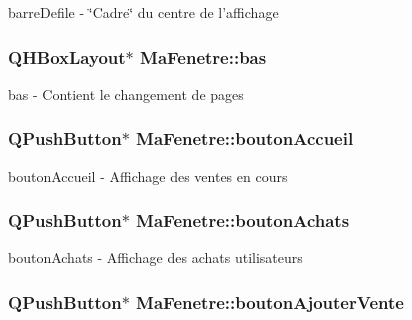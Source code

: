 barre\-Defile -\/ \char`\"{}\-Cadre\char`\"{} du centre de l'affichage 

\hypertarget{class_ma_fenetre_aff3315e53711db117feadab319660cee}{
\subsubsection[{bas}]{\setlength{\rightskip}{0pt plus 5cm}Q\-H\-Box\-Layout$\ast$ Ma\-Fenetre\-::bas\hspace{0.3cm}{\ttfamily [protected]}}}\label{class_ma_fenetre_aff3315e53711db117feadab319660cee}


bas -\/ Contient le changement de pages 

\hypertarget{class_ma_fenetre_a0316aa06b89b812a8528a8ccbe81561a}{
\subsubsection[{bouton\-Accueil}]{\setlength{\rightskip}{0pt plus 5cm}Q\-Push\-Button$\ast$ Ma\-Fenetre\-::bouton\-Accueil\hspace{0.3cm}{\ttfamily [protected]}}}\label{class_ma_fenetre_a0316aa06b89b812a8528a8ccbe81561a}


bouton\-Accueil -\/ Affichage des ventes en cours 

\hypertarget{class_ma_fenetre_aba39f3cf91351a7d6d0a6188ac831ad5}{
\subsubsection[{bouton\-Achats}]{\setlength{\rightskip}{0pt plus 5cm}Q\-Push\-Button$\ast$ Ma\-Fenetre\-::bouton\-Achats\hspace{0.3cm}{\ttfamily [protected]}}}\label{class_ma_fenetre_aba39f3cf91351a7d6d0a6188ac831ad5}


bouton\-Achats -\/ Affichage des achats utilisateurs 

\hypertarget{class_ma_fenetre_a422d1e619aa51ff42b5ecd2c5476ce19}{
\subsubsection[{bouton\-Ajouter\-Vente}]{\setlength{\rightskip}{0pt plus 5cm}Q\-Push\-Button$\ast$ Ma\-Fenetre\-::bouton\-Ajouter\-Vente\hspace{0.3cm}{\ttfamily [protected]}}}\label{class_ma_fenetre_a422d1e619aa51ff42b5ecd2c5476ce19}


